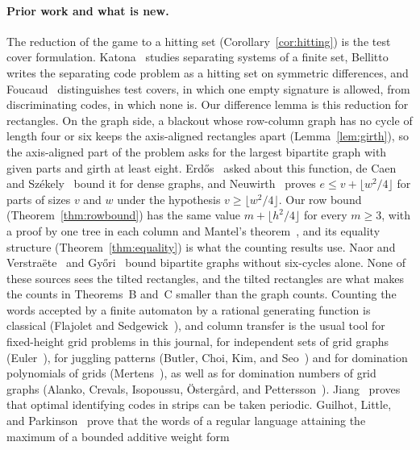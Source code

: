 \paragraph{Prior work and what is new.} The reduction of the game to a hitting set
(Corollary~\ref{cor:hitting}) is the test cover formulation.
Katona~\cite{katona1966} studies separating systems of a finite set,
Bellitto~\cite[Section~2.1]{bellitto2018} writes the separating code problem as a
hitting set on symmetric differences, and Foucaud~\cite[Section~1.1]{foucaud2015}
distinguishes test covers, in which one empty signature is allowed, from
discriminating codes, in which none is. Our difference lemma is this reduction for
rectangles. On the graph side, a blackout whose row-column graph has no cycle of
length four or six keeps the axis-aligned rectangles apart (Lemma~\ref{lem:girth}),
so the axis-aligned part of the problem asks for the largest bipartite graph with
given parts and girth at least eight. Erd\H{o}s~\cite{erdos1080} asked about this
function, de Caen and Sz\'ekely~\cite{decaenszekely1997} bound it for dense graphs,
and Neuwirth~\cite[Theorem~1]{neuwirth2001} proves $e\le v+\lfloor w^2/4\rfloor$ for
parts of sizes $v$ and $w$ under the hypothesis $v\ge\lfloor w^2/4\rfloor$. Our row
bound (Theorem~\ref{thm:rowbound}) has the same value $m+\lfloor h^2/4\rfloor$ for
every $m\ge3$, with a proof by one tree in each column and Mantel's
theorem~\cite{mantel1907}, and its equality structure (Theorem~\ref{thm:equality})
is what the counting results use. Naor and Verstra\"ete~\cite{naorverstraete2005} and
Gy\H{o}ri~\cite{gyori1997} bound bipartite graphs without six-cycles alone. None of
these sources sees the tilted rectangles, and the tilted rectangles are what makes
the counts in Theorems~B and~C smaller than the graph counts. Counting the words
accepted by a finite automaton by a rational generating function is classical
(Flajolet and Sedgewick~\cite[Propositions~I.3 and~V.6]{flajolet2009}), and column
transfer is the usual tool for fixed-height grid problems in this journal, for
independent sets of grid graphs (Euler~\cite{euler2005}), for juggling patterns
(Butler, Choi, Kim, and Seo~\cite{butler2019}) and for domination polynomials of
grids (Mertens~\cite{mertens2024}), as well as for domination numbers of grid graphs
(Alanko, Crevals, Isopoussu, \"Osterg\r{a}rd, and Pettersson~\cite{alanko2011}).
Jiang~\cite{jiang2018} proves that optimal identifying codes in strips can be taken
periodic. Guilhot, Little, and Parkinson~\cite[Theorem~1]{glp2025} prove that the
words of a regular language attaining the maximum of a bounded additive weight form
